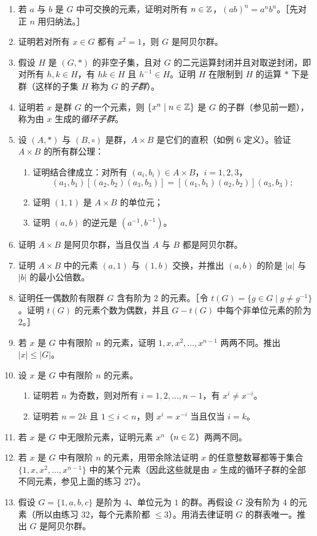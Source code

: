 \begin{enumerate}[label=\arabic*.]
  \item 若 $a$ 与 $b$ 是 $G$ 中可交换的元素，证明对所有 $n\in\mathbb{Z}$，$(ab)^n=a^nb^n$。［先对正 $n$ 用归纳法。］
  \item 证明若对所有 $x\in G$ 都有 $x^2=1$，则 $G$ 是阿贝尔群。
  \item 假设 $H$ 是 $(G,*)$ 的非空子集，且对 $G$ 的二元运算封闭并且对取逆封闭，即对所有 $h,k\in H$，有 $hk\in H$ 且 $h^{-1}\in H$。证明 $H$ 在限制到 $H$ 的运算 $*$ 下是群（这样的子集 $H$ 称为 $G$ 的\emph{子群}）。
  \item 证明若 $x$ 是群 $G$ 的一个元素，则 $\{x^n\mid n\in\mathbb{Z}\}$ 是 $G$ 的子群（参见前一题），称为由 $x$ 生成的\emph{循环子群}。
  \item 设 $(A,*)$ 与 $(B,\circ)$ 是群，$A\times B$ 是它们的直积（如例 6 定义）。验证 $A\times B$ 的所有群公理：
  \begin{enumerate}[label=(\alph*)]
    \item 证明结合律成立：对所有 $(a_i,b_i)\in A\times B$，$i=1,2,3$，
    \[
      (a_1,b_1)[(a_2,b_2)(a_3,b_3)]=[(a_1,b_1)(a_2,b_2)](a_3,b_3);
    \]
    \item 证明 $(1,1)$ 是 $A\times B$ 的单位元；
    \item 证明 $(a,b)$ 的逆元是 $(a^{-1},b^{-1})$。
  \end{enumerate}
  \item 证明 $A\times B$ 是阿贝尔群，当且仅当 $A$ 与 $B$ 都是阿贝尔群。
  \item 证明 $A\times B$ 中的元素 $(a,1)$ 与 $(1,b)$ 交换，并推出 $(a,b)$ 的阶是 $|a|$ 与 $|b|$ 的最小公倍数。
  \item 证明任一偶数阶有限群 $G$ 含有阶为 $2$ 的元素。［令 $t(G)=\{g\in G\mid g\neq g^{-1}\}$。证明 $t(G)$ 的元素个数为偶数，并且 $G-t(G)$ 中每个非单位元素的阶为 $2$。］
  \item 若 $x$ 是 $G$ 中有限阶 $n$ 的元素，证明 $1,x,x^2,\ldots,x^{n-1}$ 两两不同。推出 $|x|\leq |G|$。
  \item 设 $x$ 是 $G$ 中有限阶 $n$ 的元素。
  \begin{enumerate}[label=(\alph*)]
    \item 证明若 $n$ 为奇数，则对所有 $i=1,2,\ldots,n-1$，有 $x^i\neq x^{-i}$。
    \item 证明若 $n=2k$ 且 $1\leq i<n$，则 $x^i=x^{-i}$ 当且仅当 $i=k$。
  \end{enumerate}
  \item 若 $x$ 是 $G$ 中无限阶元素，证明元素 $x^n$（$n\in\mathbb{Z}$）两两不同。
  \item 若 $x$ 是 $G$ 中有限阶 $n$ 的元素，用带余除法证明 $x$ 的任意整数幂都等于集合 $\{1,x,x^2,\ldots,x^{n-1}\}$ 中的某个元素（因此这些就是由 $x$ 生成的循环子群的全部不同元素，参见上面的练习 27）。
  \item 假设 $G=\{1,a,b,c\}$ 是阶为 $4$、单位元为 $1$ 的群。再假设 $G$ 没有阶为 $4$ 的元素（所以由练习 32，每个元素阶都 $\leq 3$）。用消去律证明 $G$ 的群表唯一。推出 $G$ 是阿贝尔群。
\end{enumerate}

